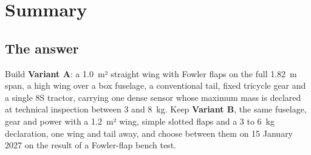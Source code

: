 \section{Summary}

\subsection{The answer}
Build \textbf{Variant A}: a 1.0~m² straight wing with Fowler flaps on the full 1.82~m span, a high wing over a box fuselage, a conventional tail, fixed tricycle gear and a single 8S tractor, carrying one dense sensor whose maximum mass is declared at technical inspection between 3 and 8~kg. Keep \textbf{Variant B}, the same fuselage, gear and power with a 1.2~m² wing, simple slotted flaps and a 3 to 6~kg declaration, one wing and tail away, and choose between them on 15 January 2027 on the result of a Fowler-flap bench test.

\vspace{4pt}
\noindent{}

